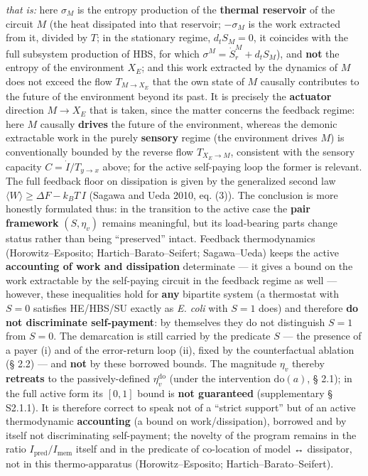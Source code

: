 \documentclass[pdflatex,sn-mathphys-ay]{sn-jnl}
\begin{document}
\emph{that is:} here \(\sigma_{M}\) is the entropy production of the \textbf{thermal reservoir} of the circuit \(M\) (the heat dissipated into that reservoir; \(-\sigma_{M}\) is the work extracted from it, divided by \(T\); in the stationary regime, \(d_t S_M = 0\), it coincides with the full subsystem production of HBS, for which \(\sigma^M = \dot S_r^M + d_t S_M\)), and \textbf{not} the entropy of the environment \(X_E\); and this work extracted by the dynamics of \(M\) does not exceed the flow \(T_{M \to X_E}\) that the own state of \(M\) causally contributes to the future of the environment beyond its past. It is precisely the \textbf{actuator} direction \(M \to X_E\) that is taken, since the matter concerns the feedback regime: here \(M\) causally \textbf{drives} the future of the environment, whereas the demonic extractable work in the purely \textbf{sensory} regime (the environment drives \(M\)) is conventionally bounded by the reverse flow \(T_{X_E \to M}\), consistent with the sensory capacity \(C = \dot I / T_{y \to x}\) above; for the active self-paying loop the former is relevant. The full feedback floor on dissipation is given by the generalized second law \(\langle W\rangle \ge \Delta F - k_B T\,I\) (Sagawa and Ueda 2010, eq. (3)). The conclusion is more honestly formulated thus: in the transition to the active case the \textbf{pair framework} \((S, \eta_v)\) remains meaningful, but its load-bearing parts change status rather than being ``preserved'' intact. Feedback thermodynamics (Horowitz--Esposito; Hartich--Barato--Seifert; Sagawa--Ueda) keeps the active \textbf{accounting of work and dissipation} determinate --- it gives a bound on the work extractable by the self-paying circuit in the feedback regime as well --- however, these inequalities hold for \textbf{any} bipartite system (a thermostat with \(S = 0\) satisfies HE/HBS/SU exactly as \emph{E. coli} with \(S = 1\) does) and therefore \textbf{do not discriminate self-payment}: by themselves they do not distinguish \(S = 1\) from \(S = 0\). The demarcation is still carried by the predicate \(S\) --- the presence of a payer (i) and of the error-return loop (ii), fixed by the counterfactual ablation (§ 2.2) --- and \textbf{not} by these borrowed bounds. The magnitude \(\eta_v\) thereby \textbf{retreats} to the passively-defined \(\eta_v^{\mathrm{do}}\) (under the intervention \(\mathrm{do}(a)\), § 2.1); in the full active form its \([0, 1]\) bound is \textbf{not guaranteed} (supplementary § S2.1.1). It is therefore correct to speak not of a ``strict support'' but of an active thermodynamic \textbf{accounting} (a bound on work/dissipation), borrowed and by itself not discriminating self-payment; the novelty of the program remains in the ratio \(I_{\text{pred}}/I_{\text{mem}}\) itself and in the predicate of co-location of model ↔ dissipator, not in this thermo-apparatus (Horowitz--Esposito; Hartich--Barato--Seifert).
\end{document}
